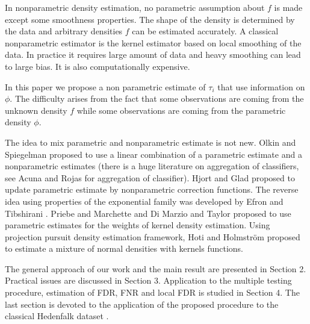 \documentclass[10pt]{article}
\begin{document}
In nonparametric density estimation, no parametric assumption about $f$ is made except some smoothness properties. The shape of the density  is determined by
the data and arbitrary densities $f$ can be estimated accurately. A classical nonparametric estimator is the kernel estimator based on local smoothing of the
data. In practice it requires large amount of data and heavy smoothing can lead to large bias. It is also computationally expensive.


In this paper we propose a non parametric estimate of $\tau_i$ that
use information on $\phi$. The difficulty arises from the fact that
some observations are coming from the unknown density $f$ while some
observations are coming from the parametric density $\phi$.


The idea to mix parametric and nonparametric estimate is not new. Olkin and Spiegelman \cite{OlS87} proposed to use a linear combination of a parametric
estimate and a nonparametric estimates (there is a huge literature on aggregation of classifiers, see Acuna and Rojas \cite{AcR01} for aggregation of
classifier). Hjort and Glad \cite{HjG95} proposed to update parametric estimate by nonparametric correction functions. The reverse idea using properties of the
exponential family was developed by Efron and Tibshirani \cite{EfT96}. Priebe and Marchette \cite{PrM00} and Di Marzio and Taylor \cite{DMT04} proposed to use
parametric estimates for the weights of kernel density estimation. Using projection pursuit density estimation framework, Hoti and Holmstr\"om \cite{HoH04}
proposed to estimate a mixture of normal densities with kernels functions.

The general approach of our work and the main result are presented in Section 2. Practical issues are discussed in Section 3. Application to the multiple
testing procedure, estimation of FDR, FNR and local FDR is studied in Section 4. The last section is devoted to the application of the proposed procedure to
the classical Hedenfalk  dataset \cite{HDC01}.

%
%
\end{document}
